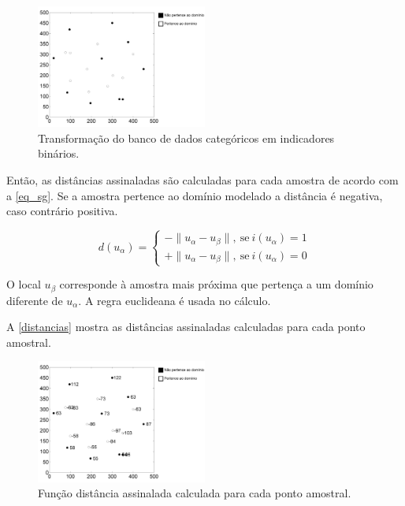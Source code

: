 \begin{figure}[!ht]
	\caption{\label{indicadores}Transformação do banco de dados categóricos em indicadores binários.}
	\begin{center}
		\includegraphics[width=0.5\textwidth]{modelagem_geologica/indicadores}
	\end{center}
\end{figure}

Então, as distâncias assinaladas são calculadas para cada amostra de acordo com a \autoref{eq_sg}. Se a amostra pertence ao domínio modelado a distância é negativa, caso contrário positiva.

\begin{equation}
	d(u_\alpha)=\begin{cases}
	-\parallel u_\alpha-u_\beta\parallel,\:\textrm{se}\:i(u_\alpha)=1\\
	+\parallel u_\alpha-u_\beta\parallel,\:\textrm{se}\:i(u_\alpha)=0\end{cases}
    \label{eq_sg}
\end{equation}

O local $u_\beta$ corresponde à amostra mais próxima que pertença a um domínio diferente de $u_\alpha$. A regra euclideana é usada no cálculo.

A \autoref{distancias} mostra as distâncias assinaladas calculadas para cada ponto amostral.

\begin{figure}[!ht]
	\caption{\label{distancias}Função distância assinalada calculada para cada ponto amostral.}
	\begin{center}
		\includegraphics[width=0.5\textwidth]{modelagem_geologica/SG}
	\end{center}
\end{figure}

